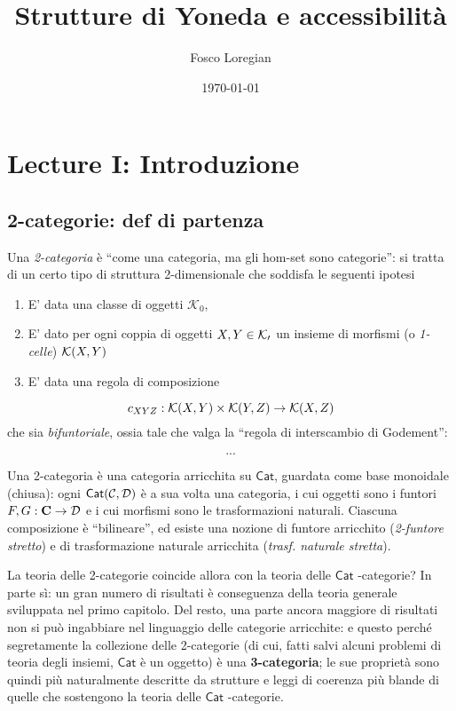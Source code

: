 \documentclass[11pt]{article}
\author{Fosco Loregian}
\date{\today}
\title{Strutture di Yoneda e accessibilità}
\def\C{\mathbf{C}}
\def\Cat{\mathsf{Cat}}
\theoremstyle{reference}
\begin{document}
\maketitle
\tableofcontents




\section{Lecture I: Introduzione}
\label{sec:orgcba1c6d}
\subsection{2-categorie: def di partenza}
\label{sec:orgf326424}
Una \emph{2-categoria} è ``come una categoria, ma gli hom-set
sono categorie'': si tratta di un certo tipo di struttura
2-dimensionale che soddisfa le seguenti ipotesi

\begin{enumerate}
\item E' data una classe di oggetti \(\mathcal K_0\),
\item E' dato per ogni coppia di oggetti \(X,Y\in \cal K_0\) un
insieme di morfismi (o \emph{1-celle}) \({\cal K}(X,Y)\)
\item E' data una regola di composizione
\end{enumerate}
$$ c_{XYZ} : {\cal K}(X,Y)\times {\cal K}(Y,Z) \to {\cal
K}(X,Z) $$ che sia \emph{bifuntoriale}, ossia tale che valga la
``regola di interscambio di Godement'': 

$$ ... $$ 

Una 2-categoria è una categoria arricchita su \(\Cat\),
guardata come base monoidale (chiusa): ogni \(\Cat({\cal
C},{\cal D})\) è a sua volta una categoria, i cui oggetti
sono i funtori \(F,G : \C\to {\cal D}\) e i cui morfismi
sono le trasformazioni naturali. Ciascuna composizione è
``bilineare'', ed esiste una nozione di funtore arricchito
(\emph{2-funtore stretto}) e di trasformazione naturale
arricchita (\emph{trasf. naturale stretta}).

La teoria delle 2-categorie coincide allora con la teoria
delle \(\Cat\) -categorie? In parte sì: un gran numero di
risultati è conseguenza della teoria generale sviluppata nel
primo capitolo. Del resto, una parte ancora maggiore di
risultati non si può ingabbiare nel linguaggio delle
categorie arricchite: e questo perché segretamente la
collezione delle 2-categorie (di cui, fatti salvi alcuni
problemi di teoria degli insiemi, \(\Cat\) è un oggetto) è una
\textbf{3-categoria}; le sue proprietà sono quindi più naturalmente
descritte da strutture e leggi di coerenza più blande di
quelle che sostengono la teoria delle \(\Cat\) -categorie.
\end{document}
